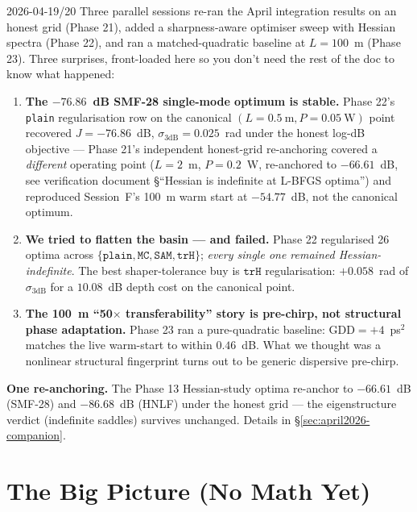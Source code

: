 \documentclass[12pt,a4paper]{article}
\begin{document}
\begin{update}{2026-04-19/20}
Three parallel sessions re-ran the April integration results on an
honest grid (Phase 21), added a sharpness-aware optimiser sweep with
Hessian spectra (Phase 22), and ran a matched-quadratic baseline at
$L=100$~m (Phase 23). Three surprises, front-loaded here so you don't
need the rest of the doc to know what happened:
\begin{enumerate}[leftmargin=*,topsep=2pt]
  \item \textbf{The $-76.86$~dB SMF-28 single-mode optimum is stable.}
        Phase 22's \texttt{plain} regularisation row on the canonical
        $(L{=}0.5~\text{m}, P{=}0.05~\text{W})$ point recovered
        $J = -76.86$~dB, $\sigma_{3\text{dB}} = 0.025$~rad under the
        honest log-dB objective --- Phase 21's independent honest-grid
        re-anchoring covered a \emph{different} operating point
        ($L{=}2$~m, $P{=}0.2$~W, re-anchored to $-66.61$~dB, see
        verification document \S``Hessian is indefinite at L-BFGS
        optima'') and reproduced Session~F's 100~m warm start at
        $-54.77$~dB, not the canonical optimum.
  \item \textbf{We tried to flatten the basin --- and failed.}
        Phase 22 regularised 26 optima across $\{\texttt{plain},
        \texttt{MC}, \texttt{SAM}, \texttt{trH}\}$; \emph{every single
        one remained Hessian-indefinite}. The best shaper-tolerance buy is
        $\texttt{trH}$ regularisation: $+0.058$~rad of $\sigma_{3\text{dB}}$
        for a $10.08$~dB depth cost on the canonical point.
  \item \textbf{The 100~m ``50$\times$ transferability'' story is
        pre-chirp, not structural phase adaptation.}
        Phase 23 ran a pure-quadratic baseline: $\text{GDD}=+4$~ps$^2$
        matches the live warm-start to within $0.46$~dB. What we
        thought was a nonlinear structural fingerprint turns out to be
        generic dispersive pre-chirp.
\end{enumerate}
\textbf{One re-anchoring.} The Phase 13 Hessian-study optima re-anchor
to $-66.61$~dB (SMF-28) and $-86.68$~dB (HNLF) under the honest
grid --- the eigenstructure verdict (indefinite saddles) survives
unchanged. Details in §\ref{sec:april2026-companion}.
\end{update}

\tableofcontents
\newpage

\section{The Big Picture (No Math Yet)}
\end{document}
